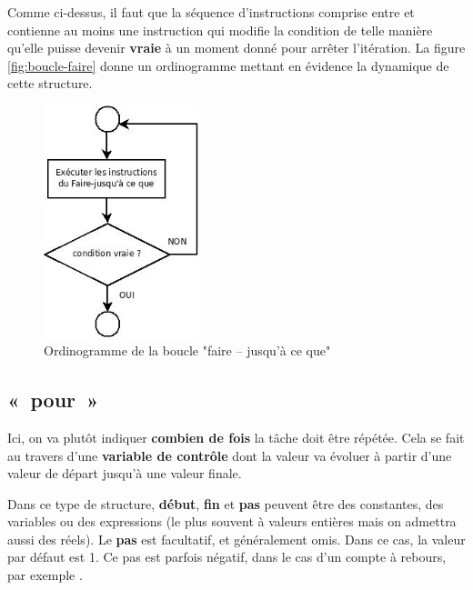 		Comme ci-dessus, il faut que la séquence d’instructions comprise entre
		 et  contienne au moins une instruction qui modifie la condition de
		telle manière qu’elle puisse devenir \textbf{vraie} à un moment donné
		pour arrêter l'itération. 
		La figure \vref{fig:boucle-faire} donne 
		un ordinogramme mettant en évidence la dynamique de cette structure. 

		\begin{figure}[h]
		\centering
		\includegraphics[width=0.4\textwidth]{image/boucle-faire}
		\caption{Ordinogramme de la boucle "faire – jusqu'à ce que"}
		\label{fig:boucle-faire}
		\end{figure}

	\subsection{«~pour~»}

		Ici, on va plutôt indiquer \textbf{combien de fois} la tâche doit être
		répétée. Cela se fait au travers d'une
		\textbf{variable de contrôle} dont la valeur va évoluer à partir
		d'une valeur de départ jusqu'à une
		valeur finale.
		

		Dans ce type de structure, \textbf{début}, \textbf{fin} et \textbf{pas}
		peuvent être des constantes, des variables ou des expressions (le plus
		souvent à valeurs entières mais on admettra aussi des réels). Le
		\textbf{pas} est facultatif, et généralement omis. Dans ce cas, la
		valeur par défaut est 1. Ce pas est parfois négatif, dans le cas
		d'un compte à rebours, par exemple
		.

